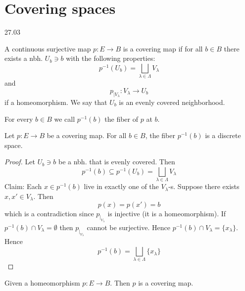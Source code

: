 \section{Covering spaces}
27.03

\begin{definition}
   A continuous surjective map
   \( p: E \to B \) is a covering
   map if for all \( b \in B \)
   there exists a nbh. \( U_b \ni b \)
   with the following properties:
   \begin{equation}
     {p}^{-1} (U_b) = \bigsqcup_{\lambda \in \Lambda} V_\lambda
   \end{equation}
  and 
  \begin{equation}
      p_{|V_\lambda}: V_\lambda \to U_b
  \end{equation}
  if a homeomorphism.
  We say that \( U_b \) is an evenly
  covered neighborhood.
\end{definition}

\begin{definition}[Fiber]
   For every \( b \in B \) 
   we call \( {p}^{-1} (b) \)
   the fiber of \( p \) at \( b \).
\end{definition}

\begin{lemma}
    Let \( p: E \to B \) be a covering map.
    For all \( b \in B \), the fiber
    \( {p}^{-1} (b) \) is a discrete space.
\end{lemma}

\begin{proof}
    Let \( U_b \ni b \) be a nbh. that
    is evenly covered.
    Then 
    \[
      {p}^{-1} (b) \subseteq {p}^{-1} (U_b)
      = \bigsqcup_{\lambda \in \Lambda} V_\lambda
    \]
    Claim: Each \( x \in {p}^{-1} (b) \) live
    in exactly one of the \( V_\lambda \)-s.
    Suppose there exists \( x, x' \in V_\lambda \).
    Then
    \[
      p(x) = p(x') = b
    \]
    which is a contradiction since
  \( p_{|_{V_\lambda}} \) is injective (it is a homeomorphism).
    If \( {p}^{-1} (b) \cap V_\lambda = \emptyset \) 
    then \( p_{|_{V_\lambda}} \) cannot be surjective.
    Hence \( {p}^{-1} (b) \cap V_\lambda = \{ x_\lambda \}  \).
    Hence
    \[
      {p}^{-1} (b) = \bigsqcup_{\lambda \in \Lambda}
      \{ x_\lambda \}
    \]
\end{proof}

\begin{example}
    Given a homeomorphism \( p: E \to B \).
    Then \( p \) is a covering map.
\end{example}


